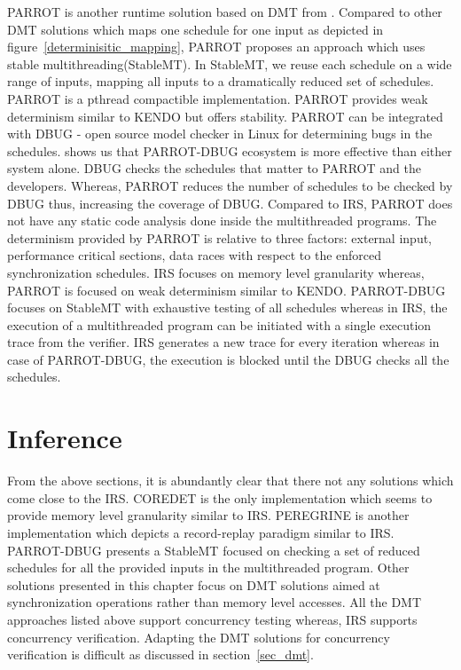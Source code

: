 PARROT is another runtime solution based on DMT from \citet{parrot}. 
Compared to other DMT solutions which maps one schedule for one input as depicted in figure~\ref{determinisitic_mapping}, PARROT proposes an approach which uses stable multithreading(StableMT). 
In StableMT, we reuse each schedule on a wide range of inputs, mapping all inputs to a dramatically reduced set of schedules. 
PARROT is a pthread compactible implementation. 
PARROT provides weak determinism similar to KENDO but offers stability. 
PARROT can be integrated with DBUG\citep{dbug} - open source model checker in Linux for determining bugs in the schedules. 
\citet{parrot} shows us that PARROT-DBUG ecosystem is more effective than either system alone. 
DBUG checks the schedules that matter to PARROT and the developers. 
Whereas, PARROT reduces the number of schedules to be checked by DBUG thus, increasing the coverage of DBUG. 
Compared to IRS, PARROT does not have any static code analysis done inside the multithreaded programs. 
The determinism provided by PARROT is relative to three factors: external input, performance critical sections, data races with respect to the enforced synchronization schedules. 
IRS focuses on memory level granularity whereas, PARROT is focused on weak determinism similar to KENDO. 
PARROT-DBUG focuses on StableMT with exhaustive testing of all schedules whereas in IRS, the execution of a multithreaded program can be initiated with a single execution trace from the verifier. 
IRS generates a new trace for every iteration whereas in case of PARROT-DBUG, the execution is blocked until the DBUG checks all the schedules.

\section*{Inference}

From the above sections, it is abundantly clear that there not any solutions which come close to the IRS. 
COREDET is the only implementation which seems to provide memory level granularity similar to IRS. 
PEREGRINE is another implementation which depicts a record-replay paradigm similar to IRS. 
PARROT-DBUG presents a StableMT focused on checking a set of reduced schedules for all the provided inputs in the multithreaded program. 
Other solutions presented in this chapter focus on DMT solutions aimed at synchronization operations rather than memory level accesses. 
All the DMT approaches listed above support concurrency testing whereas, IRS supports concurrency verification. 
Adapting the DMT solutions for concurrency verification is difficult as discussed in section~\ref{sec_dmt}.

